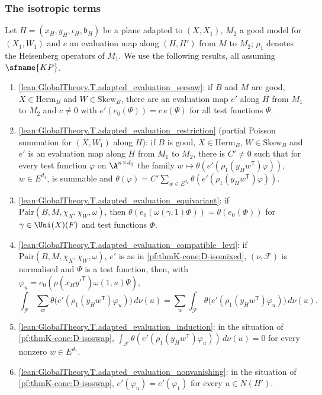 \subsubsection{The isotropic terms}
Let $H=(x_H,y_H,\iota_H,\mathfrak b_H)$ be a plane adapted to $(X,X_1)$, $M_2$ a good model for $(X_1,W_1)$ and $e$ an
evaluation map along $(H,H')$ from $M$ to $M_2$; $\rho_1$ denotes the Heisenberg operators of $M_1$.  We use the
following results, all assuming $\sfname{KP}$.
\begin{enumerate}[resume*=thmKconeD]
\item\label{pf:thmK-cone:D-isoseesaw} \cref{lean:GlobalTheory.T.adapted_evaluation_seesaw}: if $B$ and $M$ are good,
  $X\in\mathrm{Herm}_B$ and $W\in\mathrm{Skew}_B$, there are an evaluation map $e'$ along $H$ from $M_1$ to $M_2$ and
  $c\neq0$ with $e'(e_0(\Psi))=c\,e(\Psi)$ for all test functions $\Psi$.
\item\label{pf:thmK-cone:D-isomixed} \cref{lean:GlobalTheory.T.adapted_evaluation_restriction} (partial Poisson
  summation for $(X,W_1)$ along $H$): if $B$ is good, $X\in\mathrm{Herm}_B$, $W\in\mathrm{Skew}_B$ and $e'$ is an evaluation
  map along $H$ from $M_1$ to $M_2$, there is $C'\neq0$ such that for every test function $\varphi$ on $\A^{n\times d_1}$
  the family $w\mapsto\theta(e'(\rho_1(y_Hw^{\mathsf T})\varphi))$, $w\in E^{d_1}$, is summable and
  $\theta(\varphi)=C'\sum_{w\in E^{d_1}}\theta(e'(\rho_1(y_Hw^{\mathsf T})\varphi))$.
\item\label{pf:thmK-cone:D-isorat} \cref{lean:GlobalTheory.T.adapted_evaluation_equivariant}: if
  $\mathrm{Pair}(B,M,\chi_X,\chi_W,\omega)$, then $\theta(e_0(\omega(\gamma,1)\Phi))=\theta(e_0(\Phi))$ for
  $\gamma\in\Uni(X)(F)$ and test functions $\Phi$.
\item\label{pf:thmK-cone:D-isoswap} \cref{lean:GlobalTheory.T.adapted_evaluation_compatible_levi}: if
  $\mathrm{Pair}(B,M,\chi_X,\chi_W,\omega)$, $e'$ is as in \ref{pf:thmK-cone:D-isomixed}, $(\nu,\mathcal F)$ is normalised and
  $\Psi$ is a test function, then, with
  $\varphi_u=e_0(\rho(x_Hy'^{\mathsf T})\omega(1,u)\Psi)$,
  \[
    \int_{\mathcal F}\sum_{w}\theta\bigl(e'(\rho_1(y_Hw^{\mathsf T})\varphi_u)\bigr)\,d\nu(u)
    =\sum_{w}\int_{\mathcal F}\theta\bigl(e'(\rho_1(y_Hw^{\mathsf T})\varphi_u)\bigr)\,d\nu(u).
  \]
\item\label{pf:thmK-cone:D-isonz} \cref{lean:GlobalTheory.T.adapted_evaluation_induction}: in the situation of
  \ref{pf:thmK-cone:D-isoswap}, $\int_{\mathcal F}\theta(e'(\rho_1(y_Hw^{\mathsf T})\varphi_u))\,d\nu(u)=0$ for every
  nonzero $w\in E^{d_1}$.
\item\label{pf:thmK-cone:D-isozero} \cref{lean:GlobalTheory.T.adapted_evaluation_nonvanishing}: in the situation of
  \ref{pf:thmK-cone:D-isoswap}, $e'(\varphi_u)=e'(\varphi_1)$ for every $u\in N(H')$.
\end{enumerate}

